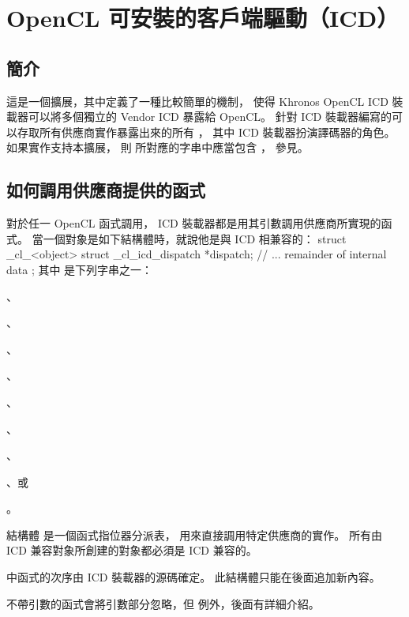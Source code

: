 \section{OpenCL 可安裝的客戶端驅動（ICD）}

\subsection{簡介}

這是一個擴展，其中定義了一種比較簡單的機制，
使得 Khronos OpenCL ICD 裝載器可以將多個獨立的 Vendor ICD 暴露給 OpenCL。
針對 ICD 裝載器編寫的可以存取所有供應商實作暴露出來的所有 ，
其中 ICD 裝載器扮演譯碼器的角色。
如果實作支持本擴展，
則  所對應的字串中應當包含 ，
參見。

\subsection{如何調用供應商提供的函式}

對於任一 OpenCL 函式調用，
 ICD 裝載器都是用其引數調用供應商所實現的函式。
當一個對象是如下結構體時，就說他是與 ICD 相兼容的：
\startclc[indentnext=no]
struct _cl_<object>
{
	struct _cl_icd_dispatch *dispatch;
	// ... remainder of internal data
};
\stopclc
其中  是下列字串之一：
\startigBase
\item {}、
\item {}、
\item {}、
\item {}、
\item {}、
\item {}、
\item {}、
\item {}、或
\item {}。
\stopigBase

結構體  是一個函式指位器分派表，
用來直接調用特定供應商的實作。
所有由 ICD 兼容對象所創建的對象都必須是 ICD 兼容的。

 中函式的次序由 ICD 裝載器的源碼確定。
此結構體只能在後面追加新內容。

不帶引數的函式會將引數部分忽略，但  例外，後面有詳細介紹。

